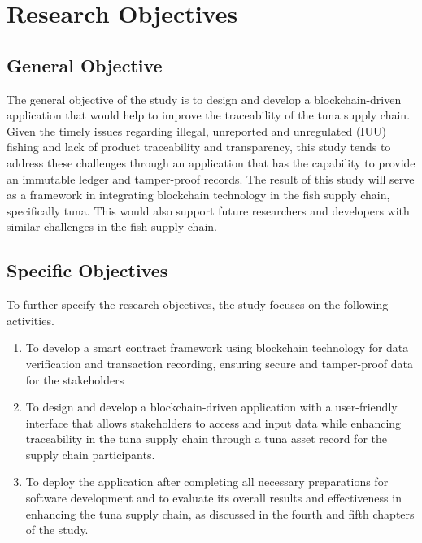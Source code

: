 \section{Research Objectives}
\label{sec:researchobjectives}

\subsection{General Objective}
\label{sec:generalobjective}

The general objective of the study is to design and develop a blockchain-driven application that would help to improve the traceability of the tuna supply chain. Given the timely issues regarding illegal, unreported and unregulated (IUU) fishing and lack of product traceability and transparency,  this study tends to address these challenges through an application that has the capability to provide an immutable ledger and tamper-proof records. The result of this study will serve as a framework in integrating blockchain technology in the fish supply chain, specifically tuna. This would also support future researchers and developers with similar challenges in the fish supply chain.


\subsection{Specific Objectives}
\label{sec:specificobjectives}

To further specify the research objectives, the study focuses on the following activities. 

\begin{enumerate}
	
	\item To develop a smart contract framework using blockchain technology for data verification and transaction recording, ensuring secure and tamper-proof data for the stakeholders
	\item To design and develop a blockchain-driven application with a user-friendly interface that allows stakeholders to access and input data while enhancing traceability in the tuna supply chain through a tuna asset record for the supply chain participants.
	\item To deploy the application after completing all necessary preparations for software development and to evaluate its overall results and effectiveness in enhancing the tuna supply chain, as discussed in the fourth and fifth chapters of the study.
\end{enumerate}


